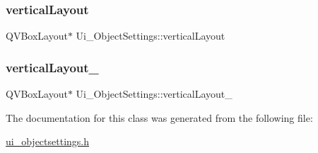 \subsubsection{\texorpdfstring{vertical\+Layout}{verticalLayout}}
{\footnotesize\ttfamily Q\+V\+Box\+Layout$\ast$ Ui\+\_\+\+Object\+Settings\+::vertical\+Layout}

\mbox{\label{class_ui___object_settings_aadf65497907ac8aca787add49f46a20d}} 
\subsubsection{\texorpdfstring{vertical\+Layout\+\_}{verticalLayout\_3}}
{\footnotesize\ttfamily Q\+V\+Box\+Layout$\ast$ Ui\+\_\+\+Object\+Settings\+::vertical\+Layout\+\_}



The documentation for this class was generated from the following file\+:\begin{DoxyCompactItemize}
\item 
\hyperlink{ui__objectsettings_8h}{ui\+\_\+objectsettings.\+h}\end{DoxyCompactItemize}
